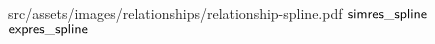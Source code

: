 
\relatplot
{src/assets/images/relationships/relationship-spline.pdf}
{$\mathsf{simres\_spline}$}
{$\mathsf{expres\_spline}$}
